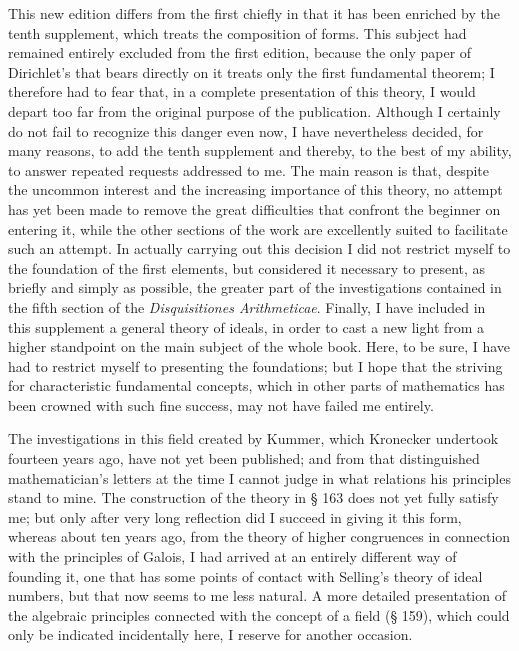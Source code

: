 \documentclass[11pt]{article}
\newcommand{\origpage}[1]{\par\vspace{0.25em}\noindent{\footnotesize\itshape [Printed page #1]}\par\vspace{0.25em}}
\begin{document}
This new edition differs from the first chiefly in that it has been enriched by the tenth supplement, which treats the composition of forms. This subject had remained entirely excluded from the first edition, because the only paper of Dirichlet's that bears directly on it treats only the first fundamental theorem; I therefore had to fear that, in a complete presentation of this theory, I would depart too far from the original purpose of the publication. Although I certainly do not fail to recognize this danger even now, I have nevertheless decided, for many reasons, to add the tenth supplement and thereby, to the best of my ability, to answer repeated requests addressed to me. The main reason is that, despite the uncommon interest and the increasing importance of this theory, no attempt has yet been made to remove the great difficulties that confront the beginner on entering it, while the other sections of the work are excellently suited to facilitate such an attempt. In actually carrying out this decision I did not restrict myself to the foundation of the first elements, but considered it necessary to present, as briefly and simply as possible, the greater part of the investigations contained in the fifth section of the \textit{Disquisitiones Arithmeticae}. Finally, I have included in this supplement a general theory of ideals, in order to cast a new light from a higher standpoint on the main subject of the whole book. Here, to be sure, I have had to restrict myself to presenting the foundations; but I hope that the striving for characteristic fundamental concepts, which in other parts of mathematics has been crowned with such fine success, may not have failed me entirely.

\origpage{397}
The investigations in this field created by Kummer, which Kronecker undertook fourteen years ago, have not yet been published; and from that distinguished mathematician's letters at the time I cannot judge in what relations his principles stand to mine. The construction of the theory in § 163 does not yet fully satisfy me; but only after very long reflection did I succeed in giving it this form, whereas about ten years ago, from the theory of higher congruences in connection with the principles of Galois, I had arrived at an entirely different way of founding it, one that has some points of contact with Selling's theory of ideal numbers, but that now seems to me less natural. A more detailed presentation of the algebraic principles connected with the concept of a field (§ 159), which could only be indicated incidentally here, I reserve for another occasion.
\end{document}
